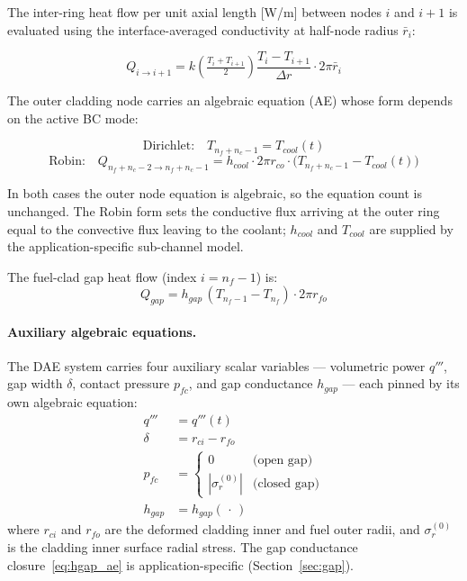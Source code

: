 \begin{refsection}
The inter-ring heat flow per unit axial length [W/m] between nodes $i$ and $i+1$ is evaluated using the interface-averaged conductivity at half-node radius $\bar{r}_i$:

\begin{equation}
  Q_{i \to i+1} = k\!\left(\tfrac{T_i + T_{i+1}}{2}\right)
                  \frac{T_i - T_{i+1}}{\Delta r} \cdot 2\pi\bar{r}_i
  \label{eq:Qflux}
\end{equation}

The outer cladding node carries an algebraic equation (AE) whose form depends on the active BC mode:

\begin{equation}
  \text{Dirichlet:}\quad T_{n_f+n_c-1} = T_{cool}(t)
  \label{eq:outerBC_dirichlet}
\end{equation}
\begin{equation}
  \text{Robin:}\quad Q_{n_f+n_c-2 \to n_f+n_c-1}
    = h_{cool}\cdot 2\pi r_{co}\cdot\bigl(T_{n_f+n_c-1} - T_{cool}(t)\bigr)
  \label{eq:outerBC_robin}
\end{equation}

In both cases the outer node equation is algebraic, so the equation count is unchanged.  The Robin form sets the conductive flux arriving at the outer ring equal to the convective flux leaving to the coolant; $h_{cool}$ and $T_{cool}$ are supplied by the application-specific sub-channel model.

The fuel-clad gap heat flow (index $i = n_f - 1$) is:
\begin{equation}
  Q_{gap} = h_{gap}\,(T_{n_f-1} - T_{n_f}) \cdot 2\pi r_{fo}
  \label{eq:Qgap}
\end{equation}

\paragraph{Auxiliary algebraic equations.} The DAE system carries four auxiliary scalar variables — volumetric power $q'''$, gap width $\delta$, contact pressure $p_{fc}$, and gap conductance $h_{gap}$ — each pinned by its own algebraic equation:
\begin{align}
  q'''    &= q'''(t)
            \label{eq:qqv_ae}\\
  \delta  &= r_{ci} - r_{fo}
            \label{eq:gap_ae}\\
  p_{fc}  &= \begin{cases}
               0                  & \text{(open gap)}   \\
               |\sigma_r^{(0)}|   & \text{(closed gap)}
             \end{cases}
            \label{eq:pfc_ae}\\
  h_{gap} &= h_{gap}(\,\cdot\,)
            \label{eq:hgap_ae}
\end{align}
where $r_{ci}$ and $r_{fo}$ are the deformed cladding inner and fuel outer radii, and $\sigma_r^{(0)}$ is the cladding inner surface radial stress. The gap conductance closure~\eqref{eq:hgap_ae} is application-specific (Section~\ref{sec:gap}).


\end{refsection}
